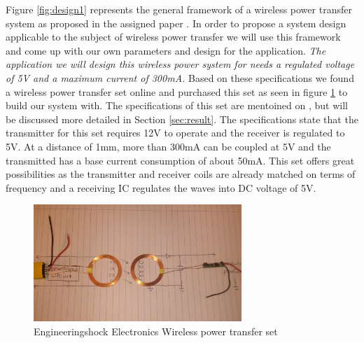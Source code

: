 Figure \ref{fig:design1} represents the general framework of a wireless power transfer system as proposed in the assigned paper \cite{paper}. In order to propose a system design applicable to the subject of wireless power transfer we will use this framework and come up with our own parameters and design for the application. \emph{The application we will design this wireless power system for needs a regulated voltage of 5V and a maximum current of 300mA. } Based on these specifications we found a wireless power transfer set online \cite{wireless} and purchased this set as seen in figure \ref{fig:set} to build our system with. The specifications of this set are mentoined on \cite{wireless}, but will be discussed more detailed in Section \ref{sec:result}. The specifications state that the transmitter for this set requires 12V to operate and the receiver is regulated to 5V. At a distance of 1mm, more than 300mA can be coupled at 5V and the transmitted has a base current consumption of about 50mA. This set offers great possibilities as the transmitter and receiver coils are already matched on terms of frequency and a receiving IC regulates the waves into DC voltage of 5V.

\begin{figure}[h!]
\centering
\includegraphics[width=0.7\textwidth]{wirelessset.jpg}
\caption{Engineeringshock Electronics Wireless power transfer set}
\label{fig:set}
\end{figure}